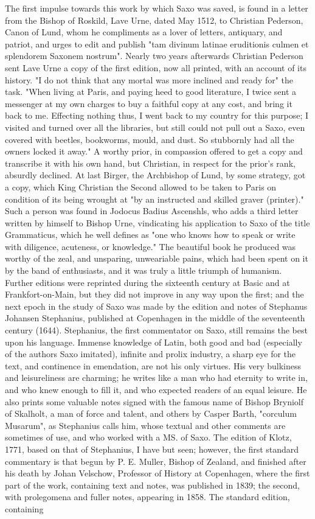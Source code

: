 \documentclass[10pt,a4paper]{report}
\begin{document}
The first impulse towards this work by which Saxo was saved, is found in a letter from the Bishop of Roskild, Lave Urne, dated May 1512, to Christian Pederson, Canon of Lund, whom he compliments as a lover of letters, antiquary, and patriot, and urges to edit and publish "tam divinum latinae eruditionis culmen et splendorem Saxonem nostrum". Nearly two years afterwards Christian Pederson sent Lave Urne a copy of the first edition, now all printed, with an account of its history. "I do not think that any mortal was more inclined and ready for" the task. "When living at Paris, and paying heed to good literature, I twice sent a messenger at my own charges to buy a faithful copy at any cost, and bring it back to me. Effecting nothing thus, I went back to my country for this purpose; I visited and turned over all the libraries, but still could not pull out a Saxo, even covered with beetles, bookworms, mould, and dust. So stubbornly had all the owners locked it away." A worthy prior, in compassion offered to get a copy and transcribe it with his own hand, but Christian, in respect for the prior's rank, absurdly declined. At last Birger, the Archbishop of Lund, by some strategy, got a copy, which King Christian the Second allowed to be taken to Paris on condition of its being wrought at "by an instructed and skilled graver (printer)." Such a person was found in Jodocus Badius Ascenshls, who adds a third letter written by himself to Bishop Urne, vindicating his application to Saxo of the title Grammaticus, which he well defines as "one who knows how to speak or write with diligence, acuteness, or knowledge." The beautiful book he produced was worthy of the zeal, and unsparing, unweariable pains, which had been spent on it by the band of enthusiasts, and it was truly a little triumph of humanism. Further editions were reprinted during the sixteenth century at Basic and at Frankfort-on-Main, but they did not improve in any way upon the first; and the next epoch in the study of Saxo was made by the edition and notes of Stephanus Johansen Stephanius, published at Copenhagen in the middle of the seventeenth century (1644). Stephanius, the first commentator on Saxo, still remains the best upon his language. Immense knowledge of Latin, both good and bad (especially of the authors Saxo imitated), infinite and prolix industry, a sharp eye for the text, and continence in emendation, are not his only virtues. His very bulkiness and leisureliness are charming; he writes like a man who had eternity to write in, and who knew enough to fill it, and who expected readers of an equal leisure. He also prints some valuable notes signed with the famous name of Bishop Bryniolf of Skalholt, a man of force and talent, and others by Casper Barth, "corculum Musarum", as Stephanius calls him, whose textual and other comments are sometimes of use, and who worked with a MS. of Saxo. The edition of Klotz, 1771, based on that of Stephanius, I have but seen; however, the first standard commentary is that begun by P. E. Muller, Bishop of Zealand, and finished after his death by Johan Velschow, Professor of History at Copenhagen, where the first part of the work, containing text and notes, was published in 1839; the second, with prolegomena and fuller notes, appearing in 1858. The standard edition, containing 
\end{document}
